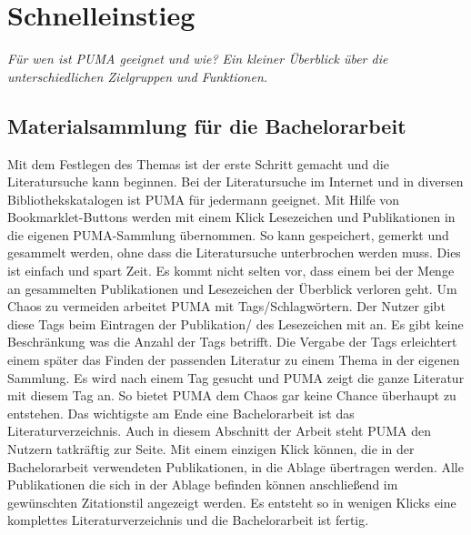 \section{Schnelleinstieg}
\textit{Für wen ist PUMA geeignet und wie? Ein kleiner Überblick über die unterschiedlichen Zielgruppen und Funktionen.}
\subsection{Materialsammlung für die Bachelorarbeit}
Mit dem Festlegen des Themas ist der erste Schritt gemacht und die Literatursuche kann beginnen. Bei der Literatursuche im Internet und in diversen Bibliothekskatalogen ist PUMA für jedermann geeignet. Mit Hilfe von Bookmarklet-Buttons werden mit einem Klick Lesezeichen und Publikationen in die eigenen PUMA-Sammlung übernommen. So kann gespeichert, gemerkt und gesammelt werden, ohne dass die Literatursuche unterbrochen werden muss. Dies ist einfach und spart Zeit. 
 \newline
Es kommt nicht selten vor, dass einem bei der Menge an gesammelten Publikationen und Lesezeichen der Überblick verloren geht. Um Chaos zu vermeiden arbeitet PUMA mit Tags/Schlagwörtern. Der Nutzer gibt diese Tags beim Eintragen der Publikation/ des Lesezeichen mit an. Es gibt keine Beschränkung was die Anzahl der Tags betrifft. Die Vergabe der Tags erleichtert einem später das Finden der passenden Literatur zu einem Thema in der eigenen Sammlung. Es wird nach einem Tag gesucht und PUMA zeigt die ganze Literatur mit diesem Tag an. So bietet PUMA dem Chaos gar keine Chance überhaupt zu entstehen. 
 \newline
Das wichtigste am Ende eine Bachelorarbeit ist das Literaturverzeichnis. Auch in diesem Abschnitt der Arbeit steht PUMA den Nutzern tatkräftig zur Seite. Mit einem einzigen Klick können, die in der Bachelorarbeit verwendeten Publikationen, in die Ablage übertragen werden. Alle Publikationen die sich in der Ablage befinden können anschließend im gewünschten Zitationstil  angezeigt werden. Es entsteht so in wenigen Klicks eine komplettes Literaturverzeichnis und die  Bachelorarbeit ist fertig.

 
